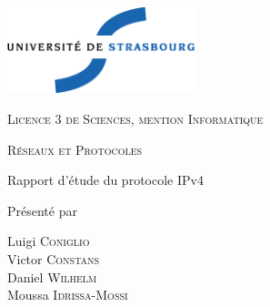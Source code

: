 \thispagestyle{empty}

\begin{center}
       \noindent
       \includegraphics[height=2.5cm]{./pics/uds.eps}       
       
       \vfill\vfill

    {\large \textsc{Licence 3 de Sciences, mention Informatique}}

    \bigskip\bigskip

    {\large \textsc{Réseaux et Protocoles}}

    \vfill\vfill

    {\huge \sc
      \begin{center}
		Rapport d'étude du protocole IPv4
      \end{center}}

    \vfill\vfill

    {\large Présenté par}

\medskip

    {\large Luigi  \textsc{Coniglio}}\\
    {\large Victor \textsc{Constans}}\\
    {\large Daniel \textsc{Wilhelm}}\\
    {\large Moussa \textsc{Idrissa-Mossi}}

\bigskip

\end{center}
